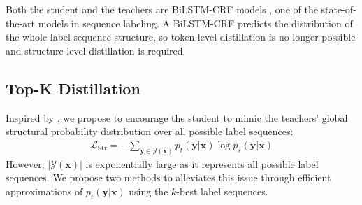 \documentclass[11pt,a4paper]{article}
\newcommand{\xvec}{\mathbf{x}}
\newcommand{\yvec}{\mathbf{y}}
\newcommand{\mcL}{\mathcal{L}}
\newcommand{\mcY}{\mathcal{Y}}
\begin{document}
Both the student and the teachers are BiLSTM-CRF models \cite{lample-etal-2016-neural,ma-hovy-2016-end}, one of the state-of-the-art models in sequence labeling. A BiLSTM-CRF predicts the distribution of the whole label sequence structure, so token-level distillation is no longer possible and structure-level distillation is required.

\subsection{Top-K Distillation}
\label{sec:Top-K}
Inspired by \citet{kim-rush-2016-sequence}, we propose to encourage the student to mimic the teachers' global structural probability distribution over all possible label sequences:
\begin{align}
\mcL_{\text{Str}} = - \sum\limits_{\yvec\in \mcY(\xvec)} p_t(\yvec|\xvec) \log p_s(\yvec|\xvec) \label{eq:strkd}
\end{align}
However, $|\mcY(\xvec)|$ is exponentially large as it represents all possible label sequences. We propose two methods to alleviates this issue through efficient approximations of $p_t(\yvec|\xvec)$ using the $k$-best label sequences.
\end{document}
